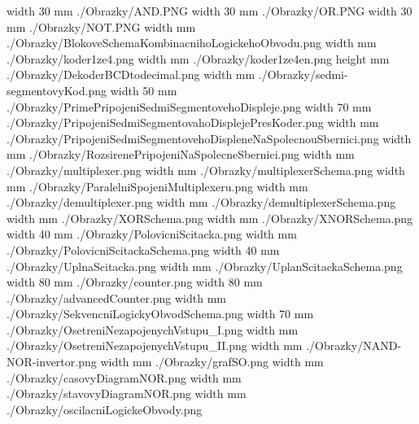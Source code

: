 


%

%
%

\pdfximage width 30 mm {./Obrazky/AND.PNG}
\pdfximage width 30 mm {./Obrazky/OR.PNG}
\pdfximage width 30 mm {./Obrazky/NOT.PNG}
\pdfximage width \the\SirkaOdstavce mm {./Obrazky/BlokoveSchemaKombinacnihoLogickehoObvodu.png}
\pdfximage width \the\SirkaOdstavce mm {./Obrazky/koder1ze4.png}
\pdfximage width \the\SirkaOdstavce mm {./Obrazky/koder1ze4en.png}
\pdfximage height \the\SirkaOdstavce mm {./Obrazky/DekoderBCDtodecimal.png}
\pdfximage width \the\SirkaOdstavce mm {./Obrazky/sedmi-segmentovyKod.png}
\pdfximage width 50 mm {./Obrazky/PrimePripojeniSedmiSegmentovehoDispleje.png}
\pdfximage width 70 mm {./Obrazky/PripojeniSedmiSegmentovahoDisplejePresKoder.png}
\pdfximage width \the\SirkaOdstavce mm {./Obrazky/PripojeniSedmiSegmentovehoDispleneNaSpolecnouSbernici.png}
\pdfximage width \the\SirkaOdstavce mm {./Obrazky/RozsirenePripojeniNaSpolecneSbernici.png}
\pdfximage width \the\SirkaOdstavce mm {./Obrazky/multiplexer.png}
\pdfximage width \the\SirkaOdstavce mm {./Obrazky/multiplexerSchema.png}
\pdfximage width \the\SirkaOdstavce mm {./Obrazky/ParalelniSpojeniMultiplexeru.png}
\pdfximage width \the\SirkaOdstavce mm {./Obrazky/demultiplexer.png}
\pdfximage width \the\SirkaOdstavce mm {./Obrazky/demultiplexerSchema.png}
\pdfximage width \the\SirkaOdstavce mm {./Obrazky/XORSchema.png}
\pdfximage width \the\SirkaOdstavce mm {./Obrazky/XNORSchema.png}
\pdfximage width 40 mm {./Obrazky/PolovicniScitacka.png}
\pdfximage width \the\SirkaOdstavce mm {./Obrazky/PolovicniScitackaSchema.png}
\pdfximage width 40 mm {./Obrazky/UplnaScitacka.png}
\pdfximage width \the\SirkaOdstavce mm {./Obrazky/UplanScitackaSchema.png}
\pdfximage width 80 mm {./Obrazky/counter.png}
\pdfximage width 80 mm {./Obrazky/advancedCounter.png}
\pdfximage width \the\SirkaOdstavce mm {./Obrazky/SekvencniLogickyObvodSchema.png}
\pdfximage width 70 mm {./Obrazky/OsetreniNezapojenychVstupu_I.png}
\pdfximage width \the\SirkaOdstavce mm {./Obrazky/OsetreniNezapojenychVstupu_II.png}
\pdfximage width \the\SirkaOdstavce mm {./Obrazky/NAND-NOR-invertor.png}
\pdfximage width \the\SirkaOdstavce mm {./Obrazky/grafSO.png}
\pdfximage width \the\SirkaOdstavce mm {./Obrazky/casovyDiagramNOR.png}
\pdfximage width \the\SirkaOdstavce mm {./Obrazky/stavovyDiagramNOR.png}
\pdfximage width \the\SirkaOdstavce mm {./Obrazky/oscilacniLogickeObvody.png}

